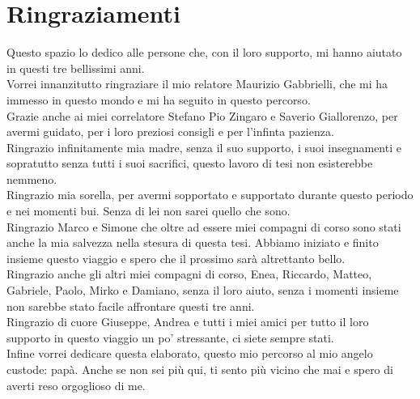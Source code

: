 \documentclass[12pt,a4paper]{report}
\begin{document}
\chapter*{Ringraziamenti}
Questo spazio lo dedico alle persone che, con il loro supporto, mi hanno aiutato in questi tre bellissimi anni.\\
Vorrei innanzitutto ringraziare il mio relatore Maurizio Gabbrielli, che mi ha immesso in questo mondo e mi ha seguito in questo percorso.\\
Grazie anche ai miei correlatore Stefano Pio Zingaro e Saverio Giallorenzo, per avermi guidato, per i loro preziosi consigli e per l'infinta pazienza.\\
Ringrazio infinitamente mia madre, senza il suo supporto, i suoi insegnamenti e sopratutto senza tutti i suoi sacrifici, questo lavoro di tesi non esisterebbe nemmeno.\\
Ringrazio mia sorella, per avermi sopportato e supportato durante questo periodo e nei momenti bui. Senza di lei non sarei quello che sono.\\
Ringrazio Marco e Simone che oltre ad essere miei compagni di corso sono stati anche la mia salvezza nella stesura di questa tesi. Abbiamo iniziato e finito insieme questo viaggio e spero che il prossimo sarà altrettanto bello.\\
Ringrazio anche gli altri miei compagni di corso, Enea, Riccardo, Matteo, Gabriele, Paolo, Mirko e Damiano, senza il loro aiuto, senza i momenti insieme non sarebbe stato facile affrontare questi tre anni.\\
Ringrazio di cuore Giuseppe, Andrea e tutti i miei amici per tutto il loro supporto in questo viaggio un po' stressante, ci siete sempre stati.\\
Infine vorrei dedicare questa elaborato, questo mio percorso al mio angelo custode: papà. Anche se non sei più qui, ti sento più vicino che mai e spero di averti reso orgoglioso di me.\\
\end{document}
